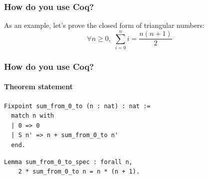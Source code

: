 \documentclass{beamer}
\begin{document}
\begin{frame}
  \frametitle{How do you use Coq?}

  As an example, let's prove the closed form of triangular numbers:
  $$ \forall n \geq 0, \,\, \sum_{i = 0}^n i = \frac{n (n + 1)}{2} $$
\end{frame}

\begin{frame}[fragile]
  \frametitle{How do you use Coq?}
  \framesubtitle{Theorem statement}

  \begin{verbatim}
Fixpoint sum_from_0_to (n : nat) : nat :=
  match n with
  | 0 => 0
  | S n' => n + sum_from_0_to n'
  end.
  \end{verbatim}

  \pause

  \begin{verbatim}
Lemma sum_from_0_to_spec : forall n,
    2 * sum_from_0_to n = n * (n + 1).
  \end{verbatim}
\end{frame}
\end{document}
